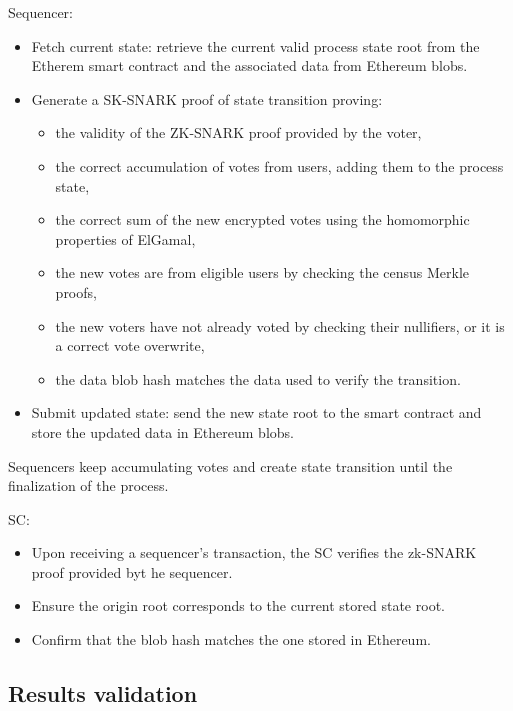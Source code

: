 Sequencer:

\begin{itemize}
	\item Fetch current state: retrieve the current valid process state root from the Etherem smart contract and the associated data from Ethereum blobs.
	\item Generate a SK-SNARK proof of state transition proving:
		\begin{itemize}
			\item the validity of the ZK-SNARK proof provided by the voter,
			\item the correct accumulation of votes from users, adding them to the process state,
			\item the correct sum of the new encrypted votes using the homomorphic properties of ElGamal,
			\item the new votes are from eligible users by checking the census Merkle proofs,
			\item the new voters have not already voted by checking their nullifiers, or it is a correct vote overwrite,
			\item the data blob hash matches the data used to verify the transition.
		\end{itemize}
	\item Submit updated state: send the new state root to the smart contract and store the updated data in Ethereum blobs.
\end{itemize}

Sequencers keep accumulating votes and create state transition until the finalization of the process.


SC:

\begin{itemize}
	\item Upon receiving a sequencer's transaction, the SC verifies the zk-SNARK proof provided byt he sequencer.
	\item Ensure the origin root corresponds to the current stored state root.
	\item Confirm that the blob hash matches the one stored in Ethereum.
\end{itemize}

\subsection{Results validation}
\label{sec:vocdoni-protocol:validation}

